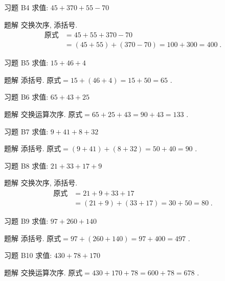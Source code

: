 \documentclass[content.tex]{subfiles}
\begin{document}
\begin{frame}{习题 B4}
求值: $45+370+55-70$
\begin{exampleblock}{题解}
交换次序, 添括号. 
\begin{align*}
\text{原式} &= 45+55+370-70 \\
&= (45+55) + (370-70) = 100 + 300 = 400\;.
\end{align*}
\end{exampleblock}
\end{frame}

\begin{frame}{习题 B5}
求值: $15+46+4$
\begin{exampleblock}{题解}
添括号. $\text{原式} = 15+(46+4) = 15+50 = 65$ .
\end{exampleblock}
\end{frame}

\begin{frame}{习题 B6}
求值: $65+43+25$
\begin{exampleblock}{题解}
交换运算次序. $\text{原式} = 65+25+43 = 90+43 = 133$ .
\end{exampleblock}
\end{frame}

\begin{frame}{习题 B7}
求值: $9+41+8+32$
\begin{exampleblock}{题解}
添括号. $\text{原式} = (9+41)+(8+32) = 50+40 = 90$ .
\end{exampleblock}
\end{frame}

\begin{frame}{习题 B8}
求值: $21+33+17+9$
\begin{exampleblock}{题解}
交换次序, 添括号. 
\begin{align*}
\text{原式} &= 21+9+33+17 \\
&= (21+9) + (33+17) = 30+50=80\;.
\end{align*}
\end{exampleblock}
\end{frame}

\begin{frame}{习题 B9}
求值: $97+260+140$
\begin{exampleblock}{题解}
添括号. $\text{原式} = 97+(260+140) = 97+400 = 497$ .
\end{exampleblock}
\end{frame}

\begin{frame}{习题 B10}
求值: $430+78+170$
\begin{exampleblock}{题解}
交换运算次序. $\text{原式} = 430+170+78 = 600+78 = 678$ .
\end{exampleblock}
\end{frame}
\end{document}
